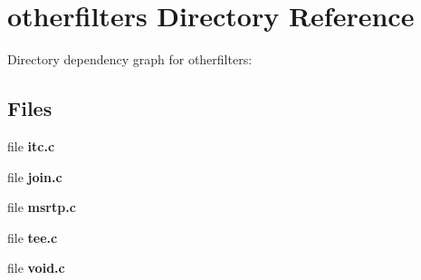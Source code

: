 \section{otherfilters Directory Reference}
\label{dir_cd74ffef37e5df1153b56ab7e0860119}
Directory dependency graph for otherfilters\-:
\subsection*{Files}
\begin{DoxyCompactItemize}
\item 
file {\bfseries itc.\-c}
\item 
file {\bfseries join.\-c}
\item 
file {\bfseries msrtp.\-c}
\item 
file {\bfseries tee.\-c}
\item 
file {\bfseries void.\-c}
\end{DoxyCompactItemize}
